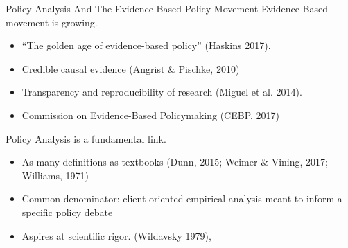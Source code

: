 \documentclass{beamer}
\begin{document}
\begin{frame}{Policy Analysis And The Evidence-Based Policy Movement}
Evidence-Based movement is growing. 
\begin{itemize}
\item ``The golden age of evidence-based policy'' (Haskins 2017).
\item Credible causal evidence (Angrist \& Pischke, 2010)
\item Transparency and reproducibility of research (Miguel et al. 2014).
\item Commission on Evidence-Based Policymaking (CEBP, 2017)
\end{itemize}
\pause
Policy Analysis is a fundamental link. 
\begin{itemize}
\item As many definitions as textbooks (Dunn, 2015; Weimer \& Vining, 2017; Williams, 1971)
\item Common denominator: client-oriented empirical analysis meant to inform a specific policy debate
\item Aspires at scientific rigor. (Wildavsky 1979),
\end{itemize}
\end{frame} 
\end{document}
